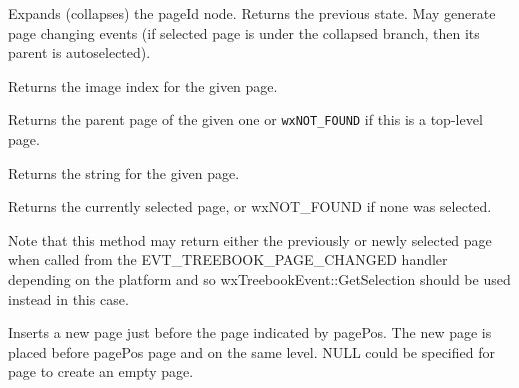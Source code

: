 
Expands (collapses) the pageId node. Returns the previous state.
May generate page changing events (if selected page
is under the collapsed branch, then its parent is autoselected).


\label{wxtreebookgetpageimage}


Returns the image index for the given page.


\label{wxtreebookgetpageparent}


Returns the parent page of the given one or \texttt{wxNOT\_FOUND} if this is a
top-level page.


\label{wxtreebookgetpagetext}


Returns the string for the given page.



\label{wxtreebookgetselection}


Returns the currently selected page, or wxNOT\_FOUND if none was selected.

Note that this method may return either the previously or newly selected page
when called from the EVT\_TREEBOOK\_PAGE\_CHANGED handler
depending on the platform and so wxTreebookEvent::GetSelection should be used instead in this case.



\label{wxtreebookinsertpage}


Inserts a new page just before the page indicated by pagePos.
The new page is placed before pagePos page and on the same level.
NULL could be specified for page to create an empty page.


\label{wxtreebookisnodeexpanded}

